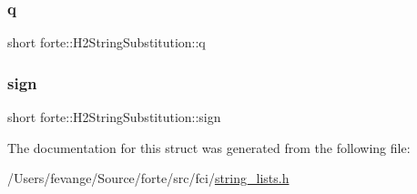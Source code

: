 \subsubsection{\texorpdfstring{q}{q}}
{\footnotesize\ttfamily short forte\+::\+H2\+String\+Substitution\+::q}

\mbox{\label{structforte_1_1_h2_string_substitution_a4ab39d34fb4783efa13cee6d71663cd6}} 
\subsubsection{\texorpdfstring{sign}{sign}}
{\footnotesize\ttfamily short forte\+::\+H2\+String\+Substitution\+::sign}



The documentation for this struct was generated from the following file\+:\begin{DoxyCompactItemize}
\item 
/\+Users/fevange/\+Source/forte/src/fci/\mbox{\hyperlink{string__lists_8h}{string\+\_\+lists.\+h}}\end{DoxyCompactItemize}
